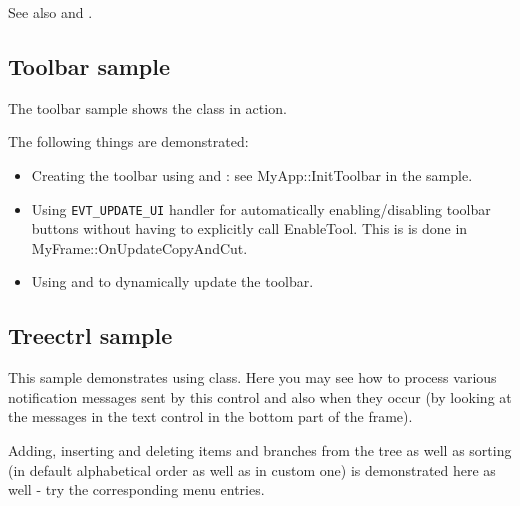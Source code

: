 See also  and .

\subsection{Toolbar sample}\label{sampletoolbar}

The toolbar sample shows the  class in action.

The following things are demonstrated:

\begin{itemize}

\item Creating the toolbar using 
and : see
MyApp::InitToolbar in the sample.

\item Using {\tt EVT\_UPDATE\_UI} handler for automatically enabling/disabling
toolbar buttons without having to explicitly call EnableTool. This is is done
in MyFrame::OnUpdateCopyAndCut.

\item Using  and 
 to dynamically update the
toolbar.

\end{itemize}

\subsection{Treectrl sample}\label{sampletreectrl}

This sample demonstrates using  class. Here
you may see how to process various notification messages sent by this control
and also when they occur (by looking at the messages in the text control in
the bottom part of the frame).

Adding, inserting and deleting items and branches from the tree as well as
sorting (in default alphabetical order as well as in custom one) is
demonstrated here as well - try the corresponding menu entries.
